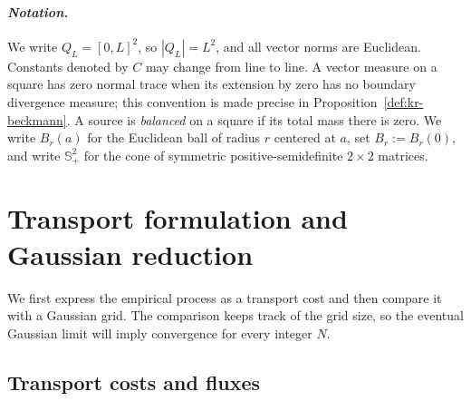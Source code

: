 \documentclass{aomart}
\theoremstyle{definition}
\newcommand{\1}{\mathbf 1}
\begin{document}
\smallskip
\paragraph{\textit{Notation.}}
We write \(Q_L=[0,L]^2\), so \(|Q_L|=L^2\), and all vector norms are
Euclidean.  Constants denoted by \(C\) may change from line to line.  A vector
measure on a square has zero normal trace when its extension by zero has no
boundary divergence measure; this convention is made precise in
Proposition~\ref{def:kr-beckmann}.  A source is \emph{balanced} on a square if
its total mass there is zero.  We write \(B_r(a)\) for the Euclidean ball of
radius \(r\) centered at \(a\), set \(B_r:=B_r(0)\), and write
\(\mathbb S_+^2\) for the cone of symmetric
positive-semidefinite \(2\times2\) matrices.

\section{Transport formulation and Gaussian reduction}\label{sec:transport}

We first express the empirical process as a transport cost and then compare
it with a Gaussian grid.  The comparison keeps track of the grid size, so
the eventual Gaussian limit will imply convergence for every integer $N$.

\subsection{Transport costs and fluxes}
\end{document}
